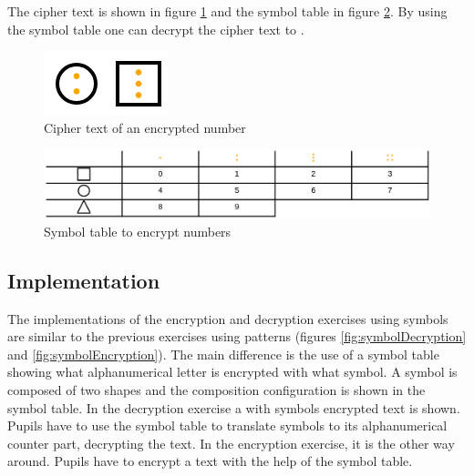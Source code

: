 \begin{example}
    The cipher text is shown in figure \ref{fig:cipher_number} and the symbol table in figure \ref{fig:symboltable_numbers}. By using the symbol table one can decrypt the cipher text to .
\end{example}

\begin{figure} 
    \centering
    \includegraphics[width=0.2 \columnwidth]{figures/cipher_number.png}
    \caption{Cipher text of an encrypted number} 
    \label{fig:cipher_number} 
\end{figure}

\begin{figure} 
    \centering
    \includegraphics[width=1.0 \columnwidth]{figures/symboltable_numbers.png}
    \caption{Symbol table to encrypt numbers} 
    \label{fig:symboltable_numbers} 
\end{figure}

\subsection{Implementation}

The implementations of the encryption and decryption exercises using symbols are similar to the previous exercises using patterns (figures \ref{fig:symbolDecryption} and \ref{fig:symbolEncryption}). The main difference is the use of a symbol table showing what alphanumerical letter is encrypted with what symbol. A symbol is composed of two shapes and the composition configuration is shown in the symbol table. In the decryption exercise a with symbols encrypted text is shown. Pupils have to use the symbol table to translate symbols to its alphanumerical counter part, decrypting the text. In the encryption exercise, it is the other way around. Pupils have to encrypt a text with the help of the symbol table.

